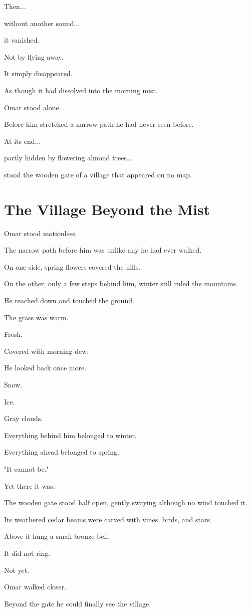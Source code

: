 \documentclass[12pt,openany]{book}
\begin{document}
Then...

without another sound...

it vanished.

Not by flying away.

It simply disappeared.

As though it had dissolved into the morning mist.

Omar stood alone.

Before him stretched a narrow path he had never seen before.

At its end...

partly hidden by flowering almond trees...

stood the wooden gate of a village that appeared on no map.
\section*{The Village Beyond the Mist}

Omar stood motionless.

The narrow path before him was unlike any he had ever walked.

On one side, spring flowers covered the hills.

On the other, only a few steps behind him, winter still ruled the mountains.

He reached down and touched the ground.

The grass was warm.

Fresh.

Covered with morning dew.

He looked back once more.

Snow.

Ice.

Gray clouds.

Everything behind him belonged to winter.

Everything ahead belonged to spring.

"It cannot be."

Yet there it was.

The wooden gate stood half open, gently swaying although no wind touched it.

Its weathered cedar beams were carved with vines, birds, and stars.

Above it hung a small bronze bell.

It did not ring.

Not yet.

Omar walked closer.

Beyond the gate he could finally see the village.
\end{document}

